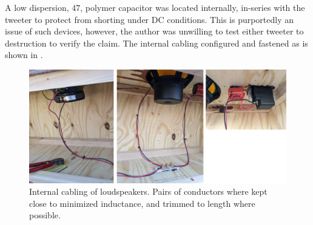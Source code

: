 %
A low dispersion, \SI{47}{\uF}, polymer capacitor was located internally, in-series with the tweeter to protect from shorting under DC conditions. This is purportedly an issue of such devices, however, the author was unwilling to test either tweeter to destruction to verify the claim. The internal cabling configured and fastened as is shown in .\par
%
\begin{figure}[h!]
\centering
\includegraphics[width = 7 in]{Images/sp_int_collage.jpg}
\caption{Internal cabling of loudspeakers. Pairs of conductors where kept close to minimized inductance, and trimmed to length where possible.}
\label{fig:sp_cabling}
\end{figure}
%

